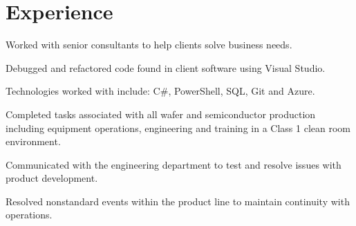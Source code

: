 \documentclass[letterpaper]{deedy-resume} %
\newcommand{\CS}{C\#}
\begin{document}
\begin{minipage}[t]{0.66\textwidth} %


\section{Experience}


\vspace{\topsep} %
\begin{tightitemize}
\item Worked with senior consultants to help clients solve business needs.
\item Debugged and refactored code found in client software using Visual Studio.
\item Technologies worked with include: \CS{}, PowerShell, SQL, Git and Azure.
\end{tightitemize}

\sectionspace %



\vspace{\topsep} %
\begin{tightitemize}
\item Completed tasks associated with all wafer and semiconductor production including equipment operations, engineering and training in a Class 1 clean room environment.
\item Communicated with the engineering department to test and resolve issues with product development.
\item Resolved nonstandard events within the product line to maintain continuity with operations.
\end{tightitemize}

\sectionspace %





\end{minipage}
\end{document}
